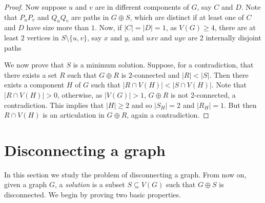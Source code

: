 \documentclass[11pt]{article}
\theoremstyle{definition}
\begin{document}
\begin{proof}
Now suppose $u$ and $v$ are in different components of $G$, say $C$ and $D$.
Note that $P_uP_v$ and $Q_uQ_v$ are paths in $G \oplus S$, which are distinct if at least one of $C$ and $D$ have size more than $1$. Now, if $|C|=|D|=1$, as $V(G) \geq 4$, there are at least $2$ vertices in $S \setminus \{u,v\}$, say $x$ and $y$, and $uxv$ and $uyv$ are 2 internally disjoint paths
 
 We now prove that $S$ is a minimum solution.
Suppose, for a contradiction, that there exists a set $R$ such that
$G \oplus R$ is $2$-connected and $|R| < |S|$.
Then there exists a component $H$ of $G$ such that
$|R \cap V(H)| < |S \cap V(H)|$.
Note that $|R\cap V(H)|>0$, otherwise, as $|V(G)|>1$, $G \oplus R$
is not 2-connected, a contradiction. 
This implies that $|H| \geq 2$ and so $|S_H|=2$ and $|R_H|=1$. But then $R \cap V(H)$
is an articulation in $G \oplus R$, again a contradiction.

\end{proof}

\section{Disconnecting a graph}

In this section we study the problem of disconnecting a graph.
From now on, given a graph $G$, a \emph{solution} is a subset
$S \subseteq V(G)$ such that $G \oplus S$ is disconnected.
We begin by proving two basic properties.
\end{document}
